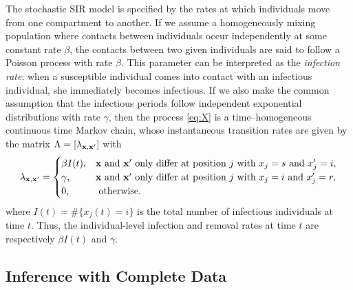 \documentclass[11pt]{article}
\newcommand{\jx}[1]{{\color{blue}{ #1}}}
\begin{document}
	The stochastic SIR model is specified by the rates at which individuals move from one compartment to another. If we assume a homogeneously mixing population where contacts between individuals occur independently at some constant rate $\beta$, the contacts between two given individuals are said to follow a Poisson process with rate $\beta$. This parameter can be interpreted as the \textit{infection rate}: when a susceptible individual comes into contact with an infectious individual, she immediately becomes infectious.
	If we also make the common assumption that the infectious periods follow independent exponential distributions with rate $\gamma$, then the process \eqref{eq:X} is a time–homogeneous continuous time Markov chain, whose instantaneous transition rates
	are given by the matrix $\Lambda = [\lambda_{\mathbf{x}, \mathbf{x}'}]$ with
	\begin{equation}
	\label{eq:rate}
    	\lambda_{\mathbf{x}, \mathbf{x}'} = 
    	\begin{cases}
    		\beta I(t), & \mathbf{x} \text{ and } \mathbf{x}' \text{ only differ at position } j \text{ with } x_j = s \text{ and } x_j' = i, \\
    		\gamma, & \mathbf{x} \text{ and } \mathbf{x}' \text{ only differ at position } j \text{ with } x_j = i \text{ and } x_j' = r, \\
    		0, & \text{ otherwise.}
    	\end{cases}
	\end{equation}
	where $I(t) = \#\{x_j(t) = i\}$ is the total number of infectious individuals at time $t$. Thus, the individual-level infection and removal rates at time $t$ are respectively $\beta I(t)$ and $\gamma$.

	
	
	\subsection{Inference with Complete Data}
	\label{sec:icd}
	
\end{document}
